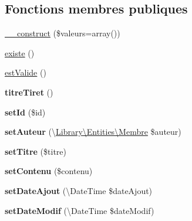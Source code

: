 \subsection*{Fonctions membres publiques}
\begin{DoxyCompactItemize}
\item 
\hyperlink{class_library_1_1_entities_1_1_news_a6a8dd1d972925f6a5e98fadc554f6710}{\+\_\+\+\_\+construct} (\$valeurs=array())
\item 
\hyperlink{class_library_1_1_entities_1_1_news_ab8d4d5d88bf20eccb470f6c675299675}{existe} ()
\item 
\hyperlink{class_library_1_1_entities_1_1_news_ad2696392106fc5da9c1ab0e5f8985531}{est\+Valide} ()
\item 
\hypertarget{class_library_1_1_entities_1_1_news_aa16d27bae87a625d31659a842918c437}{{\bfseries titre\+Tiret} ()}\label{class_library_1_1_entities_1_1_news_aa16d27bae87a625d31659a842918c437}

\item 
\hypertarget{class_library_1_1_entities_1_1_news_a87313ad678fb2a2a8efb435cf0bdb9a0}{{\bfseries set\+Id} (\$id)}\label{class_library_1_1_entities_1_1_news_a87313ad678fb2a2a8efb435cf0bdb9a0}

\item 
\hypertarget{class_library_1_1_entities_1_1_news_ab247288cbf013f50ac78573ae2bfb1cc}{{\bfseries set\+Auteur} (\textbackslash{}\hyperlink{class_library_1_1_entities_1_1_membre}{Library\textbackslash{}\+Entities\textbackslash{}\+Membre} \$auteur)}\label{class_library_1_1_entities_1_1_news_ab247288cbf013f50ac78573ae2bfb1cc}

\item 
\hypertarget{class_library_1_1_entities_1_1_news_a1d7b0177b6a719345b3a99ec2b48c5a0}{{\bfseries set\+Titre} (\$titre)}\label{class_library_1_1_entities_1_1_news_a1d7b0177b6a719345b3a99ec2b48c5a0}

\item 
\hypertarget{class_library_1_1_entities_1_1_news_aaf4dd4a7fdb5f42bef0c82425d37191e}{{\bfseries set\+Contenu} (\$contenu)}\label{class_library_1_1_entities_1_1_news_aaf4dd4a7fdb5f42bef0c82425d37191e}

\item 
\hypertarget{class_library_1_1_entities_1_1_news_aaa05a4e75bd23ffa8683d937ecaffb0f}{{\bfseries set\+Date\+Ajout} (\textbackslash{}Date\+Time \$date\+Ajout)}\label{class_library_1_1_entities_1_1_news_aaa05a4e75bd23ffa8683d937ecaffb0f}

\item 
\hypertarget{class_library_1_1_entities_1_1_news_a8af2dc090962acf2814e5ae0d3fc0db6}{{\bfseries set\+Date\+Modif} (\textbackslash{}Date\+Time \$date\+Modif)}\label{class_library_1_1_entities_1_1_news_a8af2dc090962acf2814e5ae0d3fc0db6}


\end{DoxyCompactItemize}
